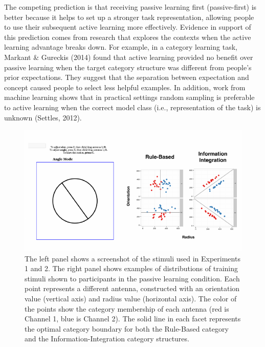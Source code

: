 \documentclass[10pt, letterpaper]{article}
\newenvironment{CodeChunk}{}{}
\begin{document}
The competing prediction is that receiving passive learning first
(passive-first) is better because it helps to set up a stronger task
representation, allowing people to use their subsequent active learning
more effectively. Evidence in support of this prediction comes from
research that explores the contexts when the active learning advantage
breaks down. For example, in a category learning task, Markant \&
Gureckis (2014) found that active learning provided no benefit over
passive learning when the target category structure was different from
people's prior expectations. They suggest that the separation between
expectation and concept caused people to select less helpful examples.
In addition, work from machine learning shows that in practical settings
random sampling is preferable to active learning when the correct model
class (i.e., representation of the task) is unknown (Settles, 2012).

\begin{CodeChunk}
\captionsetup{width=0.8\textwidth}\begin{figure}[t]

{\centering \includegraphics{figs/stimuli_exp1-1} 

}

\caption[The left panel shows a screenshot of the stimuli used in Experiments 1 and 2]{The left panel shows a screenshot of the stimuli used in Experiments 1 and 2. The right panel shows examples of distributions of training stimuli shown to participants in the passive learning condition. Each point represents a different antenna, constructed with an orientation value (vertical axis) and radius value (horizontal axis). The color of the points show the category membership of each antenna (red is Channel 1, blue is Channel 2). The solid line in each facet represents  the optimal category boundary for both the Rule-Based category and the Information-Integration category structures.}\label{fig:stimuli_exp1}
\end{figure}
\end{CodeChunk}
\end{document}
